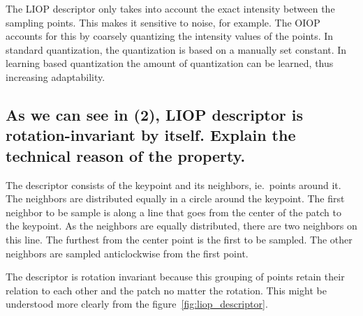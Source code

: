 The LIOP descriptor only takes into account the exact intensity between the
sampling points. This makes it sensitive to noise, for example. The OIOP
accounts for this by coarsely quantizing the intensity values of the points.
In standard quantization, the quantization is based on a manually set
constant. In learning based quantization the amount of quantization can be
learned, thus increasing adaptability.

\subsection{As we can see in (2), LIOP descriptor is rotation-invariant by
itself.  Explain the technical reason of the property.}

The descriptor consists of the keypoint and its neighbors, ie.\ points
around it.  The neighbors are distributed equally in a circle around the
keypoint. The first neighbor to be sample is along a line that goes from
the center of the patch to the keypoint. As the neighbors are equally
distributed, there are two neighbors on this line. The furthest from the
center point is the first to be sampled. The other neighbors are sampled
anticlockwise from the first point.

The descriptor is rotation invariant because this grouping of points retain
their relation to each other and the patch no matter the rotation. This
might be understood more clearly from the figure~\ref{fig:liop_descriptor}.








